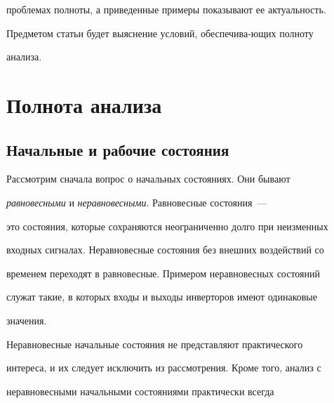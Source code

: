 проблемах полноты, а приведенные примеры показывают ее актуальность.





Предметом статьи будет выяснение условий, обеспечива-\linebreak ющих полноту 


анализа.





\vspace*{-4pt}





\section{Полнота анализа}





\vspace*{-4pt}





\subsection{Начальные и рабочие состояния} %





Рассмотрим сначала вопрос о начальных состояниях. Они бывают 


\textit{равновесными} и \textit{неравновесными}. Равновесные состояния~--- 


это состояния, которые сохраняются неограниченно долго при неизменных 


входных сигналах. Неравновесные состояния без внешних воздействий со 


временем переходят в равновесные. Примером неравновесных состояний 


служат такие, в которых входы и выходы инверторов имеют одинаковые 


значения.





Неравновесные начальные состояния не представляют практического 


интереса, и их следует исключить из рассмотрения. Кроме того, анализ с 


неравновесными начальными состояниями практически всегда 


